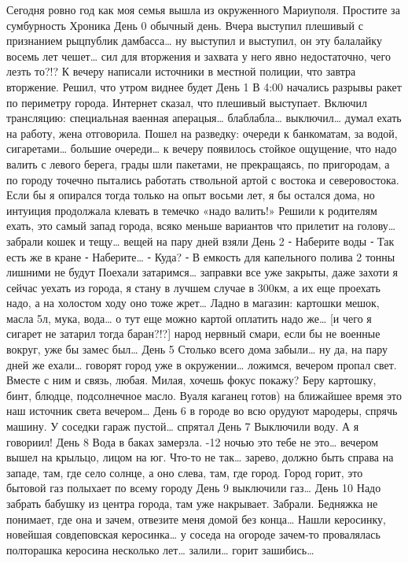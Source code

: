 Сегодня ровно год как моя семья вышла из окруженного Мариуполя. Простите за сумбурность
Хроника
День 0
обычный день. Вчера выступил плешивый с признанием рыцпублик дамбасса… ну выступил и выступил, он эту балалайку восемь лет чешет… сил для вторжения и захвата у него явно недостаточно, чего лезть то?!?
К вечеру написали источники в местной полиции, что завтра вторжение. Решил, что утром виднее будет
День 1
В 4:00 начались разрывы ракет по периметру города. Интернет сказал, что плешивый выступает. Включил трансляцию: специальная ваенная аперацыя… блаблабла… выключил… думал ехать на работу, жена отговорила. Пошел на разведку: очереди к банкоматам, за водой, сигаретами… большие очереди… к вечеру появилось стойкое ощущение, что надо валить с левого берега, грады шли пакетами, не прекращаясь, по пригородам, а по городу точечно пытались работать ствольной артой с востока и северовостока. Если бы я опирался тогда только на опыт восьми лет, я бы остался дома, но интуиция продолжала клевать в темечко «надо валить!»
Решили к родителям ехать, это самый запад города, всяко меньше вариантов что прилетит на голову… забрали кошек и тещу… вещей на пару дней взяли
День 2
⁃ Наберите воды
⁃ Так есть же в кране
⁃ Наберите…
⁃ Куда?
⁃ В емкость для капельного полива 2 тонны лишними не будут
Поехали затаримся… заправки все уже закрыты, даже захоти я сейчас уехать из города, я стану в лучшем случае в 300км, а их еще проехать надо, а на холостом ходу оно тоже жрет…
Ладно в магазин: картошки мешок, масла 5л, мука, вода… о тут еще можно картой оплатить надо же… [и чего я сигарет не затарил тогда баран?!?] народ нервный смари, если бы не военные вокруг, уже бы замес был…
День 5
Столько всего дома забыли… ну да, на пару дней же ехали… говорят город уже в окружении… ложимся, вечером пропал свет. Вместе с ним и связь, любая. 
Милая, хочешь фокус покажу?
Беру картошку, бинт, блюдце, подсолнечное масло. Вуаля каганец готов) на ближайшее время это наш источник света вечером…
День 6 в городе во всю орудуют мародеры, спрячь машину. У соседки гараж пустой… спрятал
День 7
Выключили воду. А я говориил!
День 8
Вода в баках замерзла. -12 ночью это тебе не это… вечером вышел на крыльцо, лицом на юг. Что-то не так… зарево, должно быть справа на западе, там, где село солнце, а оно слева, там, где город. Город горит, это бытовой газ полыхает по всему городу
День 9
выключили газ…
День 10
Надо забрать бабушку из центра города, там уже накрывает. Забрали. Бедняжка не понимает, где она и зачем, отвезите меня домой без конца…
Нашли керосинку, новейшая совдеповская керосинка… у соседа на огороде зачем-то провалялась полторашка керосина несколько лет… залили… горит зашибись…
